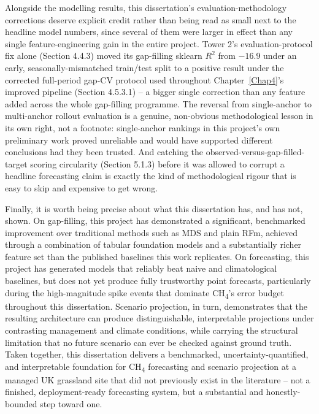 Alongside the modelling results, this dissertation's evaluation-methodology corrections deserve
explicit credit rather than being read as small next to the headline model numbers, since several of
them were larger in effect than any single feature-engineering gain in the entire project. Tower 2's
evaluation-protocol fix alone (Section 4.4.3) moved its gap-filling sklearn $R^2$ from $-16.9$ under
an early, seasonally-mismatched train/test split to a positive result under the corrected
full-period gap-CV protocol used throughout Chapter~\ref{Chap4}'s improved pipeline
(Section 4.5.3.1) -- a bigger single
correction than any feature added across the whole gap-filling programme. The reversal from
single-anchor to multi-anchor rollout evaluation is a genuine, non-obvious methodological lesson in
its own right, not a footnote: single-anchor rankings in this project's own preliminary work proved
unreliable and would have supported different conclusions had they been trusted. And catching the
observed-versus-gap-filled-target scoring circularity (Section 5.1.3) before it was allowed to
corrupt a headline forecasting claim is exactly the kind of methodological rigour that is easy to
skip and expensive to get wrong.

Finally, it is worth being precise about what this dissertation has, and has not, shown. On
gap-filling, this project has demonstrated a significant, benchmarked improvement over traditional
methods such as MDS and plain RFm, achieved through a combination of tabular foundation models and a
substantially richer feature set than the published baselines this work replicates. On forecasting,
this project has generated models that reliably beat naive and climatological baselines, but does
not yet produce fully trustworthy point forecasts, particularly during the high-magnitude spike
events that dominate CH\textsubscript{4}'s error budget throughout this dissertation. Scenario
projection, in turn, demonstrates that the resulting architecture can produce distinguishable,
interpretable projections under contrasting management and climate conditions, while carrying the
structural limitation that no future scenario can ever be checked against ground truth. Taken
together, this dissertation delivers a benchmarked, uncertainty-quantified, and interpretable
foundation for CH\textsubscript{4} forecasting and scenario projection at a managed UK grassland
site that did not previously exist in the literature -- not a finished, deployment-ready forecasting
system, but a substantial and honestly-bounded step toward one.
